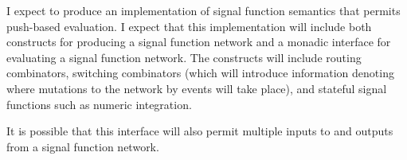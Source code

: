 \documentclass[11pt]{artikel3}
\begin{document}
I expect to produce an implementation of signal function semantics that permits push-based evaluation. I expect that this implementation will include both constructs for producing a signal function network and a monadic interface for evaluating a signal function network. The constructs will include routing combinators, switching combinators (which will introduce information denoting where mutations to the network by events will take place), and stateful signal functions such as
numeric integration.

It is possible that this interface will also permit multiple inputs to and outputs from a signal function network.

{}

\end{document}
